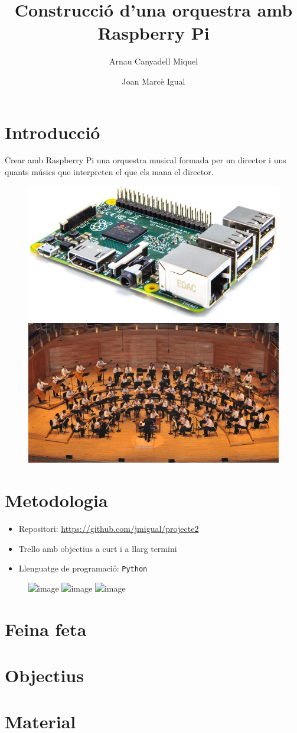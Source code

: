 \documentclass{beamer}
\title{Construcció d'una orquestra amb Raspberry Pi}
\author{Arnau Canyadell Miquel \and Joan Marcè Igual}
\begin{document}
\frame{\titlepage}
\section{Introducció}

\begin{frame}
	Crear amb Raspberry Pi una orquestra musical formada per un director i uns quants músics que interpreten el que els mana el director.
	\begin{figure}
		\includegraphics[width=0.475\linewidth]{images/raspberry}
		\hfill
		\includegraphics[width=0.475\linewidth]{images/orchestra}
	\end{figure}
\end{frame}

\section{Metodologia}

\begin{frame}
	\begin{itemize}[<+->]
		\item Repositori: \url{https://github.com/jmigual/projecte2}
		\item Trello amb objectius a curt i a llarg termini
		\item Llenguatge de programació: \texttt{Python}
	\end{itemize}
	\begin{figure}
		\hfill
		\includegraphics<1->[width=0.3\textwidth]{images/github}
		\hfill
		\includegraphics<2->[width=0.32\textwidth]{images/trello}
		\hfill
		\includegraphics<3->[width=0.3\textwidth]{images/python}
		\hfill
	\end{figure}
\end{frame}
\section{Feina feta}
\section{Objectius}
\section{Material}
\end{document}
